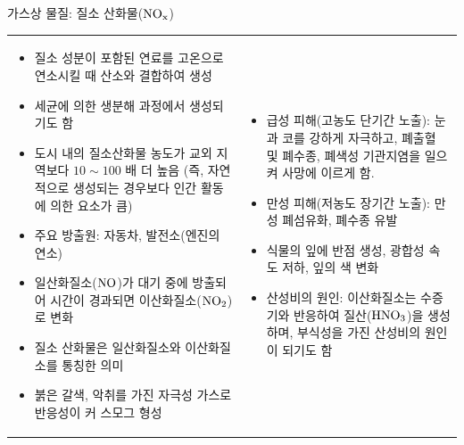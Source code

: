 \begin{frame}[t]{가스상 물질: 질소 산화물($\rm{{NO}_{x}}$)}
	\begin{tabular}{ll}
		\begin{minipage}[t]{0.475\textwidth}\scriptsize
			\begin{itemize}
				\item 질소 성분이 포함된 연료를 고온으로 연소시킬 때 산소와 결합하여 생성
				\item 세균에 의한 생분해 과정에서 생성되기도 함
				\item 도시 내의 질소산화물 농도가 교외 지역보다 $10 \sim 100$ 배 더 높음 
				(즉, 자연적으로 생성되는 경우보다 인간 활동에 의한 요소가 큼)
				\item 주요 방출원: 자동차, 발전소(엔진의 연소)
				\item 일산화질소($\rm{NO}$)가 대기 중에 방출되어 시간이 경과되면 이산화질소($\rm{{NO}_{2}}$)로 변화
				\item 질소 산화물은 일산화질소와 이산화질소를 통칭한 의미
				\item 붉은 갈색, 악취를 가진 자극성 가스로 반응성이 커 스모그 형성
			\end{itemize}
		\end{minipage}	
		&
		\begin{minipage}[t]{0.475\textwidth} \scriptsize	
			\begin{itemize}
				\item 급성 피해(고농도 단기간 노출): 눈과 코를 강하게 자극하고, 폐출혈 및 폐수종, 폐색성 기관지염을 일으켜 사망에 이르게 함.
				\item 만성 피해(저농도 장기간 노출): 만성 폐섬유화, 폐수종 유발
				\item 식물의 잎에 반점 생성, 광합성 속도 저하, 잎의 색 변화
				\item 산성비의 원인: 이산화질소는 수증기와 반응하여 질산($\rm{{HNO}_{3}}$)을 생성하며, 부식성을 가진 산성비의 원인이 되기도 함
			\end{itemize}
		\end{minipage}
	\end{tabular}
\end{frame}




